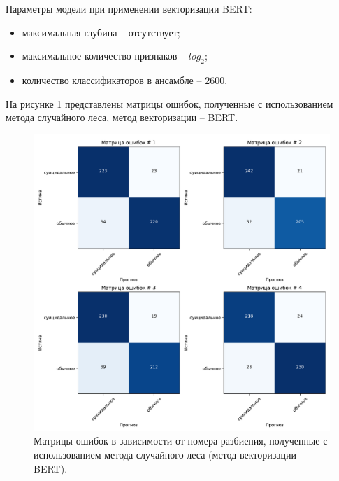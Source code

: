 Параметры модели при применении векторизации BERT:
\begin{itemize}
	\item максимальная глубина -- отсутствует;
	\item максимальное количество признаков -- $log_2$;
	\item количество классификаторов в ансамбле -- 2600.
\end{itemize}

На рисунке \ref{img:randomMatrBert} представлены матрицы ошибок, полученные с использованием метода случайного леса, метод векторизации -- BERT.
\begin{figure}[H]
	\centering
	\includegraphics[width=\textwidth]{inc/plots/randomMatrBert.pdf}
	\caption{ Матрицы ошибок в зависимости от номера разбиения, полученные с использованием метода случайного леса (метод векторизации -- BERT). }
	\label{img:randomMatrBert}
\end{figure}

